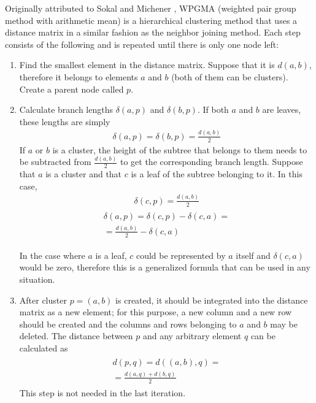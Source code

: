 \documentclass[11pt,twocolumn]{article}
\begin{document}
Originally attributed to Sokal and Michener \cite{sokal58}, WPGMA (weighted pair group method with arithmetic mean) is a hierarchical clustering method that uses a distance matrix in a similar fashion as the neighbor joining method. Each step consists of the following and is repeated until there is only one node left:

\begin{enumerate}
\item Find the smallest element in the distance matrix. Suppose that it is $d(a, b)$, therefore it belongs to elements $a$ and $b$ (both of them can be clusters). Create a parent node called $p$.

\item Calculate branch lengths $\delta(a, p)$ and $\delta(b, p)$. If both $a$ and $b$ are leaves, these lengths are simply
\begin{align}
\delta(a, p) = \delta(b, p) = \frac{d(a, b)}{2}
\end{align}
If $a$ or $b$ is a cluster, the height of the subtree that belongs to them needs to be subtracted from $\frac{d(a, b)}{2}$ to get the  corresponding branch length. Suppose that $a$ is a cluster and that $c$ is a leaf of the subtree belonging to it. In this case,
\begin{align}
\delta(c, p) = \frac{d(a, b)}{2}
\end{align}
\begin{align}
\begin{split}
\delta(a, p) = \delta(c, p) - \delta(c, a) = \\
= \frac{d(a, b)}{2} - \delta(c, a)
\end{split}
\end{align}

In the case where $a$ is a leaf, $c$ could be represented by $a$ itself and $\delta(c, a)$ would be zero, therefore this is a generalized formula that can be used in any situation.

\item After cluster $p = (a, b)$ is created, it should be integrated into the distance matrix as a new element; for this purpose, a new column and a new row should be created and the columns and rows belonging to $a$ and $b$ may be deleted. The distance between $p$ and any arbitrary element $q$ can be calculated as
\begin{align}
\begin{split}
d(p, q) = d((a, b), q) = \\
= \frac{d(a, q) + d(b, q)}{2}
\end{split}
\end{align}
This step is not needed in the last iteration.

\end{enumerate}
\end{document}
